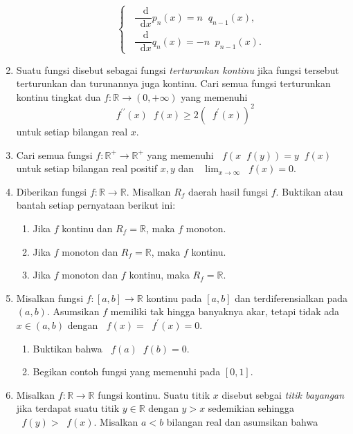 \documentclass[12pt]{article}
\newcommand*\diff{\mathop{}\!\mathrm{d}}
\newcommand*\func[2]{\mathop{}\!{#1}{\left({#2}\right)}}
\newcommand*\ds[1]{\mathop{}\!\displaystyle{{#1}}}
\begin{document}
\begin{enumerate}[leftmargin=*]
\begin{enumerate}
\[\begin{cases}
					\func{\dfrac{\diff}{\diff{x}}p_{n}}{x} = n\func{q_{n - 1}}{x}, \\[5pt]
					\func{\dfrac{\diff}{\diff{x}}q_{n}}{x} = -n\func{p_{n - 1}}{x}.
				\end{cases}
			\]
		\end{enumerate}
		\item Suatu fungsi disebut sebagai fungsi \textit{terturunkan kontinu} jika fungsi tersebut terturunkan dan turunannya juga kontinu. Cari semua fungsi terturunkan kontinu tingkat dua $ f : \mathbb{R} \to \left(0, +\infty\right) $ yang memenuhi
		\[ \func{f^{\prime\prime}}{x}\func{f}{x} \geq 2\left(\func{f^{\prime}}{x}\right)^{2} \]
		untuk setiap bilangan real $ x $.
		\item Cari semua fungsi $ f : \mathbb{R^{+}} \to \mathbb{R^{+}} $ yang memenuhi $ \func{f}{x\func{f}{y}} = y\func{f}{x} $ untuk setiap bilangan real positif $ x, y $ dan $ \ds{\lim_{x \to \infty}{\func{f}{x}}} = 0 $.
		\item Diberikan fungsi $ f : \mathbb{R} \to \mathbb{R} $. Misalkan $ R_{f} $ daerah hasil fungsi $ f $. Buktikan atau bantah setiap pernyataan berikut ini:
		\begin{enumerate}
			\item Jika $ f $ kontinu dan $ R_{f} = \mathbb{R} $, maka $ f $ monoton.
			\item Jika $ f $ monoton dan $ R_{f} = \mathbb{R} $, maka $ f $ kontinu.
			\item Jika $ f $ monoton dan $ f $ kontinu, maka $ R_{f} = \mathbb{R} $.
		\end{enumerate}
		\item Misalkan fungsi $ f : \left[a, b\right] \to \mathbb{R} $ kontinu pada $ \left[a, b\right] $ dan terdiferensialkan pada $ \left(a, b\right) $. Asumsikan $ f $ memiliki tak hingga banyaknya akar, tetapi tidak ada $ x \in \left(a, b\right) $ dengan $ \func{f}{x} = \func{f^{\prime}}{x} = 0 $.
		\begin{enumerate}
			\item Buktikan bahwa $ \func{f}{a}\func{f}{b} = 0 $.
			\item Begikan contoh fungsi yang memenuhi pada $ \left[0, 1\right] $.
		\end{enumerate}
		\item Misalkan $ f : \mathbb{R} \to \mathbb{R} $ fungsi kontinu. Suatu titik $ x $ disebut sebgai \textit{titik bayangan} jika terdapat suatu titik $ y \in \mathbb{R} $ dengan $ y > x $ sedemikian sehingga $ \func{f}{y} > \func{f}{x} $. Misalkan $ a < b $ bilangan real dan asumsikan bahwa

\end{enumerate}
\end{document}
